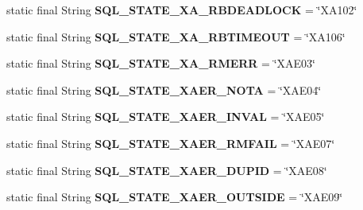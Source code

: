 \begin{DoxyCompactItemize}
static final String {\bfseries S\+Q\+L\+\_\+\+S\+T\+A\+T\+E\+\_\+\+X\+A\+\_\+\+R\+B\+D\+E\+A\+D\+L\+O\+CK} = \char`\"{}X\+A102\char`\"{}
\item 
\mbox{\label{classcom_1_1mysql_1_1jdbc_1_1_s_q_l_error_a405909f6a3ca29915c973d369512bb95}} 
static final String {\bfseries S\+Q\+L\+\_\+\+S\+T\+A\+T\+E\+\_\+\+X\+A\+\_\+\+R\+B\+T\+I\+M\+E\+O\+UT} = \char`\"{}X\+A106\char`\"{}
\item 
\mbox{\label{classcom_1_1mysql_1_1jdbc_1_1_s_q_l_error_a5f6db4895d2ebcf7d92878139f79a4e0}} 
static final String {\bfseries S\+Q\+L\+\_\+\+S\+T\+A\+T\+E\+\_\+\+X\+A\+\_\+\+R\+M\+E\+RR} = \char`\"{}X\+A\+E03\char`\"{}
\item 
\mbox{\label{classcom_1_1mysql_1_1jdbc_1_1_s_q_l_error_a9501ab072f2d5730a103b5ff5dc1ab6a}} 
static final String {\bfseries S\+Q\+L\+\_\+\+S\+T\+A\+T\+E\+\_\+\+X\+A\+E\+R\+\_\+\+N\+O\+TA} = \char`\"{}X\+A\+E04\char`\"{}
\item 
\mbox{\label{classcom_1_1mysql_1_1jdbc_1_1_s_q_l_error_a19192298abaeaf69a8d4c35caf1c3935}} 
static final String {\bfseries S\+Q\+L\+\_\+\+S\+T\+A\+T\+E\+\_\+\+X\+A\+E\+R\+\_\+\+I\+N\+V\+AL} = \char`\"{}X\+A\+E05\char`\"{}
\item 
\mbox{\label{classcom_1_1mysql_1_1jdbc_1_1_s_q_l_error_a70e727dfdfeb1695f6a7f866317e768f}} 
static final String {\bfseries S\+Q\+L\+\_\+\+S\+T\+A\+T\+E\+\_\+\+X\+A\+E\+R\+\_\+\+R\+M\+F\+A\+IL} = \char`\"{}X\+A\+E07\char`\"{}
\item 
\mbox{\label{classcom_1_1mysql_1_1jdbc_1_1_s_q_l_error_a1f287de4cc279d8a3832095ddc00ade3}} 
static final String {\bfseries S\+Q\+L\+\_\+\+S\+T\+A\+T\+E\+\_\+\+X\+A\+E\+R\+\_\+\+D\+U\+P\+ID} = \char`\"{}X\+A\+E08\char`\"{}
\item 
\mbox{\label{classcom_1_1mysql_1_1jdbc_1_1_s_q_l_error_abb5835a48b3c2b3469ea89fdff13704e}} 
static final String {\bfseries S\+Q\+L\+\_\+\+S\+T\+A\+T\+E\+\_\+\+X\+A\+E\+R\+\_\+\+O\+U\+T\+S\+I\+DE} = \char`\"{}X\+A\+E09\char`\"{}
\end{DoxyCompactItemize}


